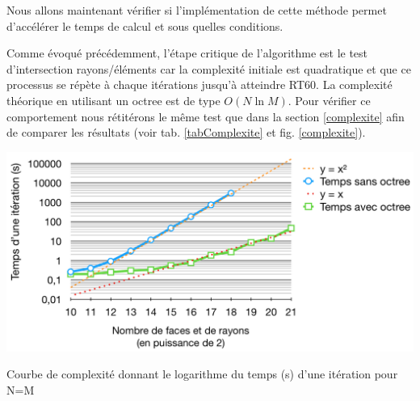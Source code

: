 Nous allons maintenant vérifier si l'implémentation de cette méthode permet d'accélérer le temps de calcul et sous quelles conditions. 


%



Comme évoqué précédemment, l'étape critique de l'algorithme est le test d'intersection rayons/éléments car la complexité initiale est quadratique et que ce processus se répète à chaque itérations jusqu'à atteindre \gls{RT60}. La complexité théorique en utilisant un \gls{octree} est de type $O(N\ln{M})$. 
Pour vérifier ce comportement nous rétitérons le même test que dans la section \ref{complexite} afin de comparer les résultats (voir tab. \ref{tabComplexite} et fig. \ref{complexite}).

 \begin{figureth}
	\includegraphics[width=0.9\linewidth]{images/complexite}
	\caption{Courbe de complexité donnant le logarithme du temps (s) d'une itération pour N=M}
	\label{complexite}
\end{figureth}

